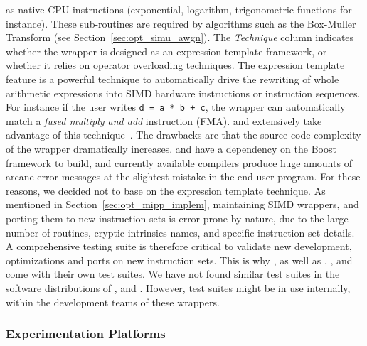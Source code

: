 as native CPU instructions (exponential, logarithm, trigonometric functions for
instance). These sub-routines are required by algorithms such as the Box-Muller
Transform (see Section~\ref{sec:opt_simu_awgn}). The \textit{\Cxx Technique}
column indicates whether the wrapper is designed as an expression template
framework, or whether it relies on operator overloading techniques. The
expression template feature is a powerful technique to automatically drive the
rewriting of whole arithmetic expressions into SIMD hardware instructions or
instruction sequences. For instance if the user writes \verb|d = a * b + c|, the
wrapper can automatically match a \emph{fused multiply and add} instruction
(FMA). \BoostSIMD and \bSIMD extensively take advantage of this
technique~\cite{Esterie2012, Esterie2012a}. The drawbacks are that the source
code complexity of the wrapper dramatically increases. \BoostSIMD and \bSIMD
have a dependency on the Boost framework to build, and currently available \Cxx
compilers produce huge amounts of arcane error messages at the slightest mistake
in the end user program. For these reasons, we decided not to base \MIPP on the
expression template technique. As mentioned in
Section~\ref{sec:opt_mipp_implem}, maintaining SIMD wrappers, and porting them
to new instruction sets is error prone by nature, due to the large number of
routines, cryptic intrinsics names, and specific instruction set details. A
comprehensive testing suite is therefore critical to validate new development,
optimizations and ports on new instruction sets. This is why \MIPP, as well as
\Vc, \BoostSIMD, \simdpp and \bSIMD come with their own test suites. We have not
found similar test suites in the software distributions of \VCL, \xsimd and
\TSIMD. However, test suites might be in use internally, within the development
teams of these wrappers.

\subsubsection{Experimentation Platforms}
\label{sec:opt_mipp_protocol}

